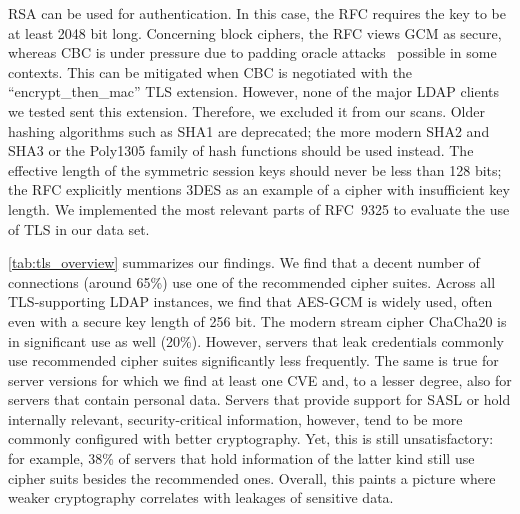RSA can be used for authentication. In this case, the RFC requires the key to be at least 2048 bit long.  Concerning block ciphers, the RFC views \acrfull{GCM} as secure, whereas \gls{CBC} is under pressure due to padding oracle attacks~\cite{_PaddingOraclesDecline_2016} possible in some contexts. This can be mitigated when \gls{CBC} is negotiated with the ``encrypt\_then\_mac'' \acrshort{TLS} extension. However, none of the major \gls{LDAP} clients we tested sent this extension. Therefore, we excluded it from our scans.
Older hashing algorithms such as SHA1 are deprecated; the more modern SHA2 and SHA3 or the Poly1305 family of hash functions should be used instead. 
The effective length of the symmetric session keys should never be less than 128 bits; the RFC explicitly mentions 3DES as an example of a cipher with insufficient key length.
We implemented the most relevant parts of RFC~9325 to evaluate the use of \acrshort{TLS} in our data set. 

\cref{tab:tls_overview} summarizes our findings. 
We find that a decent number of connections (around 65\%) use one of the recommended cipher suites. Across all \acrshort{TLS}-supporting \acrshort{LDAP} instances, we find that AES-GCM is widely used, often even with a secure key length of 256 bit. The modern stream cipher ChaCha20 is in significant use as well (20\%). However, servers that leak credentials commonly use recommended cipher suites significantly less frequently. The same is true for server versions for which we find at least one CVE and, to a lesser degree, also for servers that contain personal data. Servers that provide support for \acrfull{SASL} or hold internally relevant, security-critical information, however, tend to be more commonly configured with better cryptography. Yet, this is still unsatisfactory: for example, 38\% of servers that hold information of the latter kind still use cipher suits besides the recommended ones. Overall, this paints a picture where weaker cryptography correlates with leakages of sensitive data.

